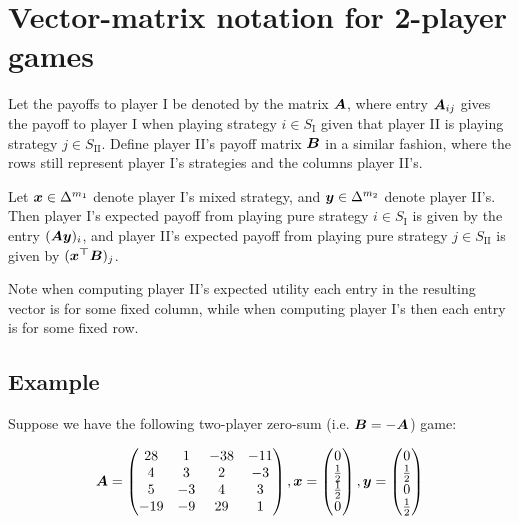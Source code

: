 \section{Vector-matrix notation for 2-player games}

Let the payoffs to player I be denoted by the matrix $\bm{A}$, where entry
$\bm{A}_{ij}$ gives the payoff to player I when playing strategy $i \in
S_\text{I}$ given that player II is playing strategy $j \in S_\text{II}$.
Define player II's payoff matrix $\bm{B}$ in a similar fashion, where the
rows still represent player I's strategies and the columns player II's.

Let $\bm{x} \in \Delta^{m_1}$ denote player I's mixed strategy, and $\bm{y}
\in \Delta^{m_2}$ denote player II's. Then player I's expected payoff from
playing pure strategy $i \in S_\text{I}$ is given by the entry $(\bm{Ay})_i$,
and player II's expected payoff from playing pure strategy $j \in S_\text{II}$
is given by $(\bm{x^\top B})_j$.

Note when computing player II's expected utility each entry in the resulting
vector is for some fixed column, while when computing player I's then each
entry is for some fixed row.

\subsection{Example}

Suppose we have the following two-player zero-sum (i.e. $\bm{B} = -\bm{A}$)
game:

\begin{equation*}
	\bm{A} = 
	\begin{pmatrix}
		28 & 1 & -38 & -11 \\
		4 & 3 & 2 & -3 \\
		5 & -3 & 4 & 3 \\
		-19 & -9 & 29 & 1
	\end{pmatrix},
	\bm{x} =
	\begin{pmatrix}
		0 \\
		\frac{1}{2} \\
		\frac{1}{2} \\
		0
	\end{pmatrix},
	\bm{y} = 
	\begin{pmatrix}
		0 \\
		\frac{1}{2} \\
		0 \\
		\frac{1}{2}
	\end{pmatrix}
\end{equation*}

